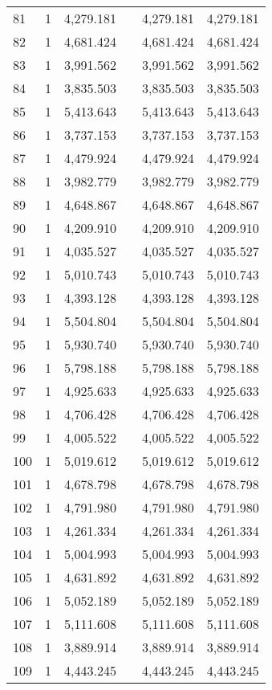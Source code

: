 \begin{table}[!htbp]
\begin{tabular}{@{\extracolsep{5pt}}lccccc}
81 & 1 & 4,279.181 &  & 4,279.181 & 4,279.181 \\ 
82 & 1 & 4,681.424 &  & 4,681.424 & 4,681.424 \\ 
83 & 1 & 3,991.562 &  & 3,991.562 & 3,991.562 \\ 
84 & 1 & 3,835.503 &  & 3,835.503 & 3,835.503 \\ 
85 & 1 & 5,413.643 &  & 5,413.643 & 5,413.643 \\ 
86 & 1 & 3,737.153 &  & 3,737.153 & 3,737.153 \\ 
87 & 1 & 4,479.924 &  & 4,479.924 & 4,479.924 \\ 
88 & 1 & 3,982.779 &  & 3,982.779 & 3,982.779 \\ 
89 & 1 & 4,648.867 &  & 4,648.867 & 4,648.867 \\ 
90 & 1 & 4,209.910 &  & 4,209.910 & 4,209.910 \\ 
91 & 1 & 4,035.527 &  & 4,035.527 & 4,035.527 \\ 
92 & 1 & 5,010.743 &  & 5,010.743 & 5,010.743 \\ 
93 & 1 & 4,393.128 &  & 4,393.128 & 4,393.128 \\ 
94 & 1 & 5,504.804 &  & 5,504.804 & 5,504.804 \\ 
95 & 1 & 5,930.740 &  & 5,930.740 & 5,930.740 \\ 
96 & 1 & 5,798.188 &  & 5,798.188 & 5,798.188 \\ 
97 & 1 & 4,925.633 &  & 4,925.633 & 4,925.633 \\ 
98 & 1 & 4,706.428 &  & 4,706.428 & 4,706.428 \\ 
99 & 1 & 4,005.522 &  & 4,005.522 & 4,005.522 \\ 
100 & 1 & 5,019.612 &  & 5,019.612 & 5,019.612 \\ 
101 & 1 & 4,678.798 &  & 4,678.798 & 4,678.798 \\ 
102 & 1 & 4,791.980 &  & 4,791.980 & 4,791.980 \\ 
103 & 1 & 4,261.334 &  & 4,261.334 & 4,261.334 \\ 
104 & 1 & 5,004.993 &  & 5,004.993 & 5,004.993 \\ 
105 & 1 & 4,631.892 &  & 4,631.892 & 4,631.892 \\ 
106 & 1 & 5,052.189 &  & 5,052.189 & 5,052.189 \\ 
107 & 1 & 5,111.608 &  & 5,111.608 & 5,111.608 \\ 
108 & 1 & 3,889.914 &  & 3,889.914 & 3,889.914 \\ 
109 & 1 & 4,443.245 &  & 4,443.245 & 4,443.245 \\ 

\end{tabular}
\end{table}

